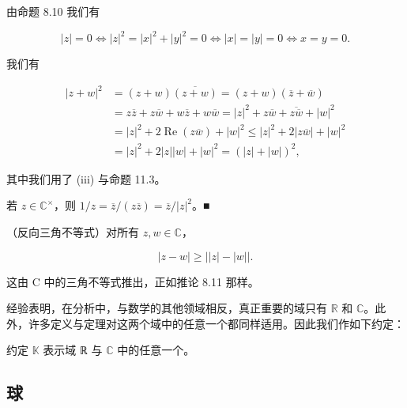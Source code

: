 \begin{proposition}
\begin{subitems}
由命题 8.10 我们有

\[
|z|=0\Longleftrightarrow|z|^{2}=|x|^{2}+|y|^{2}=0\Longleftrightarrow|x|=|y|=0\Longleftrightarrow x=y=0.
\]
\item[（v）]

我们有

\begin{equation*}
\begin{aligned}
\left|z+w\right|^{2}&=(z+w)\overline{(z+w)}=(z+w)(\overline{z}+\overline{w})\\&=z\overline{z}+z\overline{w}+w\overline{z}+w\overline{w}=\left|z\right|^{2}+z\overline{w}+\overline{z\overline{w}}+\left|w\right|^{2}\\&=\left|z\right|^{2}+2\operatorname{Re}(z\overline{w})+\left|w\right|^{2}\leq\left|z\right|^{2}+2\left|z\overline{w}\right|+\left|w\right|^{2}\\&=\left|z\right|^{2}+2\left|z\right|\left|w\right|+\left|w\right|^{2}=(|z|+|w|)^{2},
\end{aligned}
\end{equation*}

其中我们用了 (iii) 与命题 11.3。

\item[（vi）]

若 $ z \in \mathbb{C}^\times $，则 $ 1/z = \overline{z}/(z\overline{z}) = \overline{z}/|z|^2 $。■

\end{subitems}

\end{proposition}

\begin{corollary}

（反向三角不等式）对所有 $ z, w \in \mathbb{C} $，

\[
|z-w|\geq\left|\left|z\right|-\left|w\right|\right|.
\]

\proofhead
这由 C 中的三角不等式推出，正如推论 8.11 那样。

经验表明，在分析中，与数学的其他领域相反，真正重要的域只有 $ \mathbb{R} $ 和 $ \mathbb{C} $。此外，许多定义与定理对这两个域中的任意一个都同样适用。因此我们作如下约定：

约定 $ \mathbb{K} $ 表示域 ℝ 与 $ \mathbb{C} $ 中的任意一个。
\end{corollary}

\subsection*{球}

